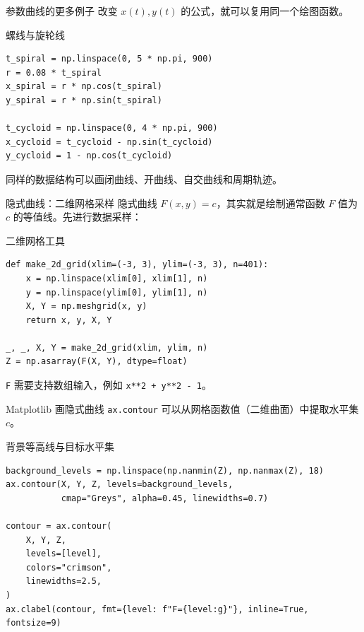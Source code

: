 \documentclass[aspectratio=169,11pt]{ctexbeamer}
\begin{document}
\begin{frame}[fragile]{参数曲线的更多例子}
  改变 \(x(t),y(t)\) 的公式，就可以复用同一个绘图函数。

  \begin{block}{螺线与旋轮线}
\begin{Verbatim}[fontsize=\tiny]
t_spiral = np.linspace(0, 5 * np.pi, 900)
r = 0.08 * t_spiral
x_spiral = r * np.cos(t_spiral)
y_spiral = r * np.sin(t_spiral)

t_cycloid = np.linspace(0, 4 * np.pi, 900)
x_cycloid = t_cycloid - np.sin(t_cycloid)
y_cycloid = 1 - np.cos(t_cycloid)
\end{Verbatim}
  \end{block}

  同样的数据结构可以画闭曲线、开曲线、自交曲线和周期轨迹。
\end{frame}

\begin{frame}[fragile]{隐式曲线：二维网格采样}
  隐式曲线 \(F(x,y)=c\)，其实就是绘制通常函数 \(F\) 值为 $c$ 的等值线。先进行数据采样：

  \begin{block}{二维网格工具}
\begin{Verbatim}[fontsize=\tiny]
def make_2d_grid(xlim=(-3, 3), ylim=(-3, 3), n=401):
    x = np.linspace(xlim[0], xlim[1], n)
    y = np.linspace(ylim[0], ylim[1], n)
    X, Y = np.meshgrid(x, y)
    return x, y, X, Y

_, _, X, Y = make_2d_grid(xlim, ylim, n)
Z = np.asarray(F(X, Y), dtype=float)
\end{Verbatim}
  \end{block}

  \texttt{F} 需要支持数组输入，例如 \texttt{x**2 + y**2 - 1}。
\end{frame}

\begin{frame}[fragile]{Matplotlib 画隐式曲线}
  \texttt{ax.contour} 可以从网格函数值（二维曲面）中提取水平集 $c$。

  \begin{block}{背景等高线与目标水平集}
\begin{Verbatim}[fontsize=\tiny]
background_levels = np.linspace(np.nanmin(Z), np.nanmax(Z), 18)
ax.contour(X, Y, Z, levels=background_levels,
           cmap="Greys", alpha=0.45, linewidths=0.7)

contour = ax.contour(
    X, Y, Z,
    levels=[level],
    colors="crimson",
    linewidths=2.5,
)
ax.clabel(contour, fmt={level: f"F={level:g}"}, inline=True, fontsize=9)
\end{Verbatim}
  \end{block}
\end{frame}
\end{document}
